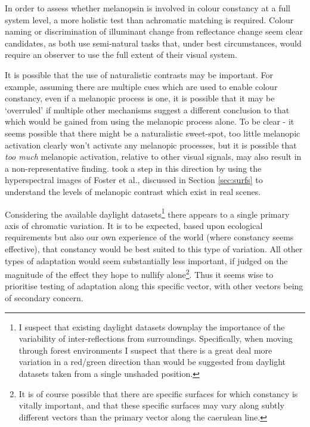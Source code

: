 In order to assess whether melanopsin is involved in colour constancy at a full system level, a more holistic test than achromatic matching is required. Colour naming or discrimination of illuminant change from reflectance change seem clear candidates, as both use semi-natural tasks that, under best circumstances, would require an observer to use the full extent of their visual system.

It is possible that the use of naturalistic contrasts may be important. For example, assuming there are multiple cues which are used to enable colour constancy, even if a melanopic process is one, it is possible that it may be `overruled' if multiple other mechanisms suggest a different conclusion to that which would be gained from using the melanopic process alone. To be clear - it seems possible that there might be a naturalistic sweet-spot, too little melanopic activation clearly won't activate any melanopic processes, but it is possible that \emph{too much} melanopic activation, relative to other visual signals, may also result in a non-representative finding. \citet{allen_form_2019} took a step in this direction by using the hyperspectral images of Foster et al., discussed in Section \ref{sec:surfs} to understand the levels of melanopic contrast which exist in real scenes.

Considering the available daylight datasets\footnote{I suspect that existing daylight datasets downplay the importance of the variability of inter-reflections from surroundings. Specifically, when moving through forest environments I suspect that there is a great deal more variation in a red/green direction than would be suggested from daylight datasets taken from a single unshaded position.} there appears to a single primary axis of chromatic variation. It is to be expected, based upon ecological requirements but also our own experience of the world (where constancy seems effective), that constancy would be best suited to this type of variation. All other types of adaptation would seem substantially less important, if judged on the magnitude of the effect they hope to nullify alone\footnote{It is of course possible that there are specific surfaces for which constancy is vitally important, and that these specific surfaces may vary along subtly different vectors than the primary vector along the caerulean line.}. Thus it seems wise to prioritise testing of adaptation along this specific vector, with other vectors being of secondary concern.

\clearpage

